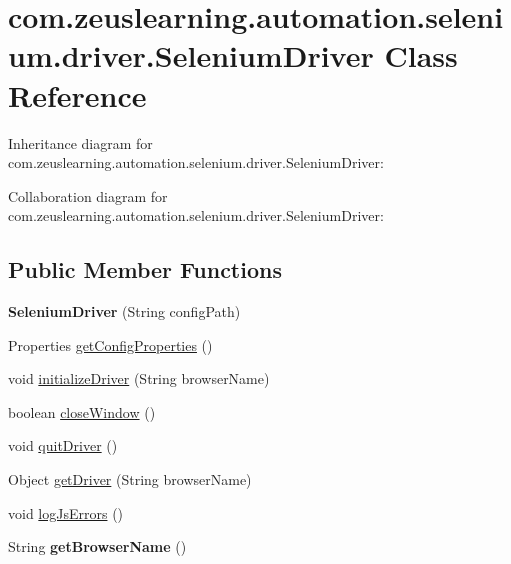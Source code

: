 \hypertarget{classcom_1_1zeuslearning_1_1automation_1_1selenium_1_1driver_1_1SeleniumDriver}{}\section{com.\+zeuslearning.\+automation.\+selenium.\+driver.\+Selenium\+Driver Class Reference}
\label{classcom_1_1zeuslearning_1_1automation_1_1selenium_1_1driver_1_1SeleniumDriver}


Inheritance diagram for com.\+zeuslearning.\+automation.\+selenium.\+driver.\+Selenium\+Driver\+:


Collaboration diagram for com.\+zeuslearning.\+automation.\+selenium.\+driver.\+Selenium\+Driver\+:
\subsection*{Public Member Functions}
\begin{DoxyCompactItemize}
\item 
\hypertarget{classcom_1_1zeuslearning_1_1automation_1_1selenium_1_1driver_1_1SeleniumDriver_a34d5cab6ed9e8ceec485eebd26989cfa}{}\label{classcom_1_1zeuslearning_1_1automation_1_1selenium_1_1driver_1_1SeleniumDriver_a34d5cab6ed9e8ceec485eebd26989cfa} 
{\bfseries Selenium\+Driver} (String config\+Path)
\item 
Properties \hyperlink{classcom_1_1zeuslearning_1_1automation_1_1selenium_1_1driver_1_1SeleniumDriver_afc8bad9a9bea7df6280ba685e52db540}{get\+Config\+Properties} ()
\item 
void \hyperlink{classcom_1_1zeuslearning_1_1automation_1_1selenium_1_1driver_1_1SeleniumDriver_a187f5d9442edc299d894d1dbeafeda0d}{initialize\+Driver} (String browser\+Name)
\item 
boolean \hyperlink{classcom_1_1zeuslearning_1_1automation_1_1selenium_1_1driver_1_1SeleniumDriver_a941fab966021a5f1c9b33544fc430b29}{close\+Window} ()
\item 
void \hyperlink{classcom_1_1zeuslearning_1_1automation_1_1selenium_1_1driver_1_1SeleniumDriver_afc293d71e5e65ae445d5568accf2a253}{quit\+Driver} ()
\item 
Object \hyperlink{classcom_1_1zeuslearning_1_1automation_1_1selenium_1_1driver_1_1SeleniumDriver_a42a9e6ef86ef492717b3fed95e9f353f}{get\+Driver} (String browser\+Name)
\item 
void \hyperlink{classcom_1_1zeuslearning_1_1automation_1_1selenium_1_1driver_1_1SeleniumDriver_a1680730a2528d0c2029aca6c8eeacec3}{log\+Js\+Errors} ()
\item 
\hypertarget{classcom_1_1zeuslearning_1_1automation_1_1selenium_1_1driver_1_1SeleniumDriver_a8c257f011e05f75b6685fc1130e21008}{}\label{classcom_1_1zeuslearning_1_1automation_1_1selenium_1_1driver_1_1SeleniumDriver_a8c257f011e05f75b6685fc1130e21008} 
String {\bfseries get\+Browser\+Name} ()
\end{DoxyCompactItemize}
